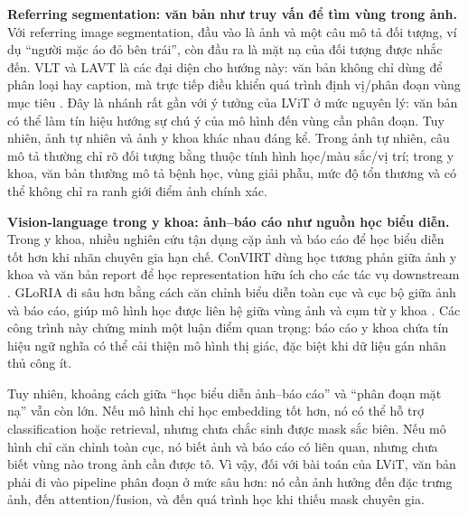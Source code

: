 \textbf{Referring segmentation: văn bản như truy vấn để tìm vùng trong ảnh.} Với referring image segmentation, đầu vào là ảnh và một câu mô tả đối tượng, ví dụ ``người mặc áo đỏ bên trái'', còn đầu ra là mặt nạ của đối tượng được nhắc đến. VLT và LAVT là các đại diện cho hướng này: văn bản không chỉ dùng để phân loại hay caption, mà trực tiếp điều khiển quá trình định vị/phân đoạn vùng mục tiêu \cite{ding2021vlt,yang2022lavt}. Đây là nhánh rất gần với ý tưởng của LViT ở mức nguyên lý: văn bản có thể làm tín hiệu hướng sự chú ý của mô hình đến vùng cần phân đoạn. Tuy nhiên, ảnh tự nhiên và ảnh y khoa khác nhau đáng kể. Trong ảnh tự nhiên, câu mô tả thường chỉ rõ đối tượng bằng thuộc tính hình học/màu sắc/vị trí; trong y khoa, văn bản thường mô tả bệnh học, vùng giải phẫu, mức độ tổn thương và có thể không chỉ ra ranh giới điểm ảnh chính xác.

\textbf{Vision-language trong y khoa: ảnh--báo cáo như nguồn học biểu diễn.} Trong y khoa, nhiều nghiên cứu tận dụng cặp ảnh và báo cáo để học biểu diễn tốt hơn khi nhãn chuyên gia hạn chế. ConVIRT dùng học tương phản giữa ảnh y khoa và văn bản report để học representation hữu ích cho các tác vụ downstream \cite{zhang2020convirt}. GLoRIA đi sâu hơn bằng cách căn chỉnh biểu diễn toàn cục và cục bộ giữa ảnh và báo cáo, giúp mô hình học được liên hệ giữa vùng ảnh và cụm từ y khoa \cite{huang2021gloria}. Các công trình này chứng minh một luận điểm quan trọng: báo cáo y khoa chứa tín hiệu ngữ nghĩa có thể cải thiện mô hình thị giác, đặc biệt khi dữ liệu gán nhãn thủ công ít.

Tuy nhiên, khoảng cách giữa ``học biểu diễn ảnh--báo cáo'' và ``phân đoạn mặt nạ'' vẫn còn lớn. Nếu mô hình chỉ học embedding tốt hơn, nó có thể hỗ trợ classification hoặc retrieval, nhưng chưa chắc sinh được mask sắc biên. Nếu mô hình chỉ căn chỉnh toàn cục, nó biết ảnh và báo cáo có liên quan, nhưng chưa biết vùng nào trong ảnh cần được tô. Vì vậy, đối với bài toán của LViT, văn bản phải đi vào pipeline phân đoạn ở mức sâu hơn: nó cần ảnh hưởng đến đặc trưng ảnh, đến attention/fusion, và đến quá trình học khi thiếu mask chuyên gia.

